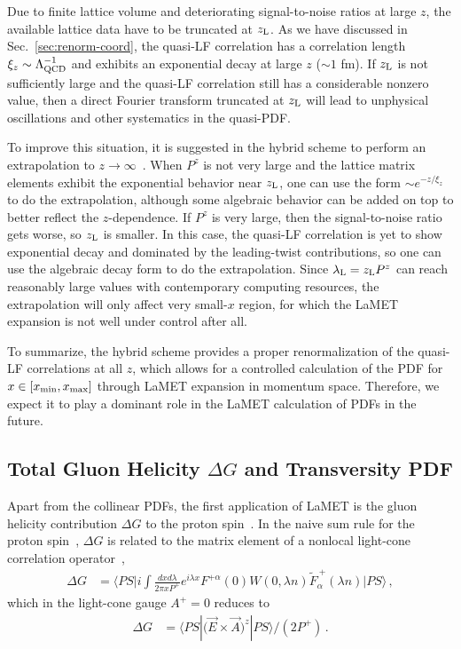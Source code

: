 \documentclass[aps,rmp,reprint,amsmath,amssymb,graphicx,longbibliography]{revtex4-1} %
\DeclareRobustCommand{\sec}[1]{Sec.~\ref{sec:#1}}
\begin{document}
Due to finite lattice volume and deteriorating signal-to-noise ratios at large $z$, the available lattice data have to be truncated at  $z_{\rm L}$.
As we have discussed in \sec{renorm-coord}, the quasi-LF correlation has a correlation length $\xi_z\sim \Lambda_{\rm QCD}^{-1}$ and exhibits an exponential decay at large $z$ ($\sim 1$ fm). If $z_{\rm L}$ is not sufficiently large and the quasi-LF correlation still has a considerable nonzero value, then a direct Fourier transform truncated at $z_{\rm L}$ will lead to unphysical oscillations and other systematics in the quasi-PDF.

To improve this situation, it is suggested in the hybrid scheme to perform an extrapolation to $z\to\infty$~\cite{Ji:2020brr}. When $P^z$ is not very large and the lattice matrix elements exhibit the exponential behavior near $z_{\rm L}$, one can use the form $\sim e^{-z/\xi_z}$ to do the extrapolation, although some algebraic behavior can be added on top to better reflect the $z$-dependence. If $P^z$ is very large, then the signal-to-noise ratio gets worse, so $z_{\rm L}$ is smaller. In this case, the quasi-LF correlation is yet to show exponential decay and dominated by the leading-twist contributions, so one can use the algebraic decay form to do the extrapolation. Since $\lambda_{\rm L} =z_{\rm L}P^z$ can reach reasonably large values with contemporary computing resources, the extrapolation will only affect very small-$x$ region, for which the LaMET expansion is not well under control after all.

To summarize, the hybrid scheme provides a proper renormalization of the quasi-LF correlations at all $z$, which allows for a controlled calculation of the PDF for $x\in[x_{\rm min}, x_{\rm max}]$ through LaMET expansion in momentum space. Therefore,  we expect it to play a dominant role in the LaMET calculation of PDFs in the future.

\subsection{Total Gluon Helicity $\Delta G$ and Transversity PDF}
\label{sec:deltaG}

Apart from the collinear PDFs, the first application of LaMET is the gluon helicity contribution $\Delta G$ to the proton spin~\cite{Ji:2013fga}. In the naive sum rule for the proton spin~\cite{Jaffe:1989jz}, $\Delta G$ is related to the matrix element of a nonlocal light-cone correlation operator~\cite{Manohar:1990jx},
\begin{align}\label{eq:sginv}
	\Delta G &\!=\! \langle PS\big|i\!\int\! \frac{dxd\lambda}{2\pi xP^+} e^{i\lambda x} \! F^{+\alpha}(0) W(0,\!\lambda n)\tilde F_{\alpha}^{~+} (\lambda n)\big|PS\rangle\,,
\end{align}
which in the light-cone gauge $A^+=0$ reduces to
\begin{align}
	\Delta G &= \langle PS| \big(\vec{E}\times \vec{A}\big)^z|PS\rangle /(2P^+)\,.
\end{align}
\end{document}
